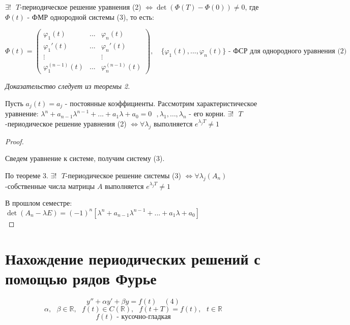 \documentclass[12pt, a4paper]{report}
\begin{document}
\begin{theorem}
    \( \exists  ! \text{ }  T  \)-периодическое решение уравнения (2) \( \Leftrightarrow  \det  (\Phi (T ) - \Phi (0))\neq 0  \), где \( \Phi (t) \) - ФМР однородной системы (3), то есть: 

    \[ \Phi(t ) = \begin{pmatrix}
    \varphi_1 (t) & ... & \varphi_n(t)\\
    \varphi_1 '(t)& ... &  \varphi_n '(t)\\
     \vdots&  & \vdots\\
     \varphi_1^{(n-1)} (t) & ... &  \varphi_n^{(n-1)} (t)
    \end{pmatrix} , \quad  \{\varphi_1 (t ), ..., \varphi_n (t)\}  \text{ - ФСР для однородного уравнения (2)} \] 
\end{theorem}

\textit{
    Доказательство следует из теоремы 2. } 

\begin{theorem}
    Пусть \( a_j(t ) = a_j  \)  - постоянные коэффициенты. Рассмотрим характеристическое уравнение: \( \lambda^n + a_{n -1 } \lambda^{n-1 }  +...+ a_1 \lambda + a_0 =0  \text{  }  ,\lambda_1, \ldots, \lambda_n  \) - его корни. \( \exists ! \text{  } T \)-периодическое решение уравнения (2) \( \Leftrightarrow  \forall  \lambda_j  \) выполняется \( e^{\lambda_j T } \neq 1   \) 
\end{theorem}

\begin{proof} \(  \) 

    \begin{flushleft}
        Сведем уравнение     к системе, получим систему (3). 

        По теореме 3. \( \exists ! \text{ } T \)-периодическое решение системы (3) \( \Leftrightarrow  \forall  \lambda_j (A_n) \)-собственные числа матрицы \( A \) выполняется \( e^{\lambda_j T}  \neq 1  \)   
    \end{flushleft}
В прошлом семестре: \( \det  (A_n - \lambda E) = (-1 )^{n }  [\lambda^n + a_{n-1 }  \lambda^{n-1 }  +...+ a_1 \lambda + a_0] \) 
\[  \] 
\end{proof}

\section{Нахождение периодических решений с помощью рядов Фурье}

\[ y '' + \alpha y ' + \beta y = f(t ) \quad (4) \] 
\[ \alpha, \text{ }  \beta \in  \mathbb{R}   , \text{ } f(t  ) \in C(\mathbb{R} ) , \text{ }  f(t+T ) = f(t ) , \text{ }  t \in \mathbb{R} \] 
\[ f(t ) \text{ - кусочно-гладкая} \]  
\end{document}
